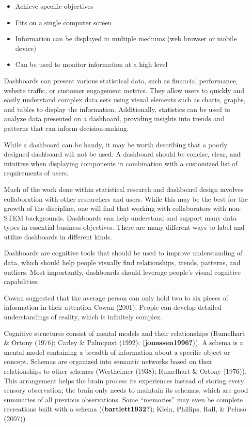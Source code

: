 \documentclass[print]{nuthesis}
\providecommand{\tightlist}{%
  \setlength{\itemsep}{0pt}\setlength{\parskip}{0pt}}
\begin{document}
\begin{itemize}
\tightlist
\item
  Achieve specific objectives
\item
  Fits on a single computer screen
\item
  Information can be displayed in multiple mediums (web browser or mobile device)
\item
  Can be used to monitor information at a high level
\end{itemize}

Dashboards can present various statistical data, such as financial performance, website traffic, or customer engagement metrics.
They allow users to quickly and easily understand complex data sets using visual elements such as charts, graphs, and tables to display the information.
Additionally, statistics can be used to analyze data presented on a dashboard, providing insights into trends and patterns that can inform decision-making.

While a dashboard can be handy, it may be worth describing that a poorly designed dashboard will not be used.
A dashboard should be concise, clear, and intuitive when displaying components in combination with a customized list of requirements of users.

Much of the work done within statistical research and dashboard design involves collaboration with other researchers and users.
While this may be the best for the growth of the discipline, one will find that working with collaborators with non-STEM backgrounds.
Dashboards can help understand and support many data types in essential business objectives.
There are many different ways to label and utilize dashboards in different kinds.

Dashboards are cognitive tools that should be used to improve understanding of data, which should help people visually find relationships, trends, patterns, and outliers.
Most importantly, dashboards should leverage people's visual cognitive capabilities.

Cowan suggested that the average person can only hold two to six pieces of information in their attention Cowan (2001).
People can develop detailed understandings of reality, which is infinitely complex.

Cognitive structures consist of mental models and their relationships (Rumelhart \& Ortony (1976); Carley \& Palmquist (1992); (\textbf{jonassen1996?})).
A schema is a mental model containing a breadth of information about a specific object or concept.
Schemas are organized into semantic networks based on their relationships to other schemas (Wertheimer (1938); Rumelhart \& Ortony (1976)).
This arrangement helps the brain process its experiences instead of storing every sensory observation; the brain only needs to maintain its schemas, which are good summaries of all previous observations.
Some ``memories'' may even be complete recreations built with a schema ((\textbf{bartlett1932?}); Klein, Phillips, Rall, \& Peluso (2007))
\end{document}
